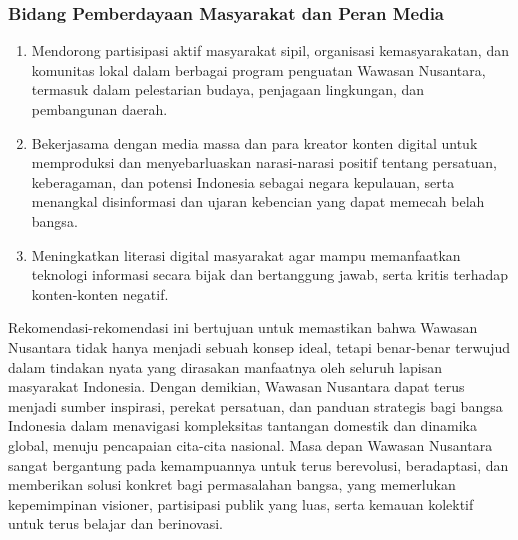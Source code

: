 \documentclass[12pt, a4paper]{article}
\begin{document}
\subsubsection*{Bidang Pemberdayaan Masyarakat dan Peran Media}
\begin{enumerate}
  \item Mendorong partisipasi aktif masyarakat sipil, organisasi kemasyarakatan, dan komunitas lokal dalam berbagai program penguatan Wawasan Nusantara, termasuk dalam pelestarian budaya, penjagaan lingkungan, dan pembangunan daerah.
  \item Bekerjasama dengan media massa dan para kreator konten digital untuk memproduksi dan menyebarluaskan narasi-narasi positif tentang persatuan, keberagaman, dan potensi Indonesia sebagai negara kepulauan, serta menangkal disinformasi dan ujaran kebencian yang dapat memecah belah bangsa.
  \item Meningkatkan literasi digital masyarakat agar mampu memanfaatkan teknologi informasi secara bijak dan bertanggung jawab, serta kritis terhadap konten-konten negatif.
\end{enumerate}
Rekomendasi-rekomendasi ini bertujuan untuk memastikan bahwa Wawasan Nusantara tidak hanya menjadi sebuah konsep ideal, tetapi benar-benar terwujud dalam tindakan nyata yang dirasakan manfaatnya oleh seluruh lapisan masyarakat Indonesia. Dengan demikian, Wawasan Nusantara dapat terus menjadi sumber inspirasi, perekat persatuan, dan panduan strategis bagi bangsa Indonesia dalam menavigasi kompleksitas tantangan domestik dan dinamika global, menuju pencapaian cita-cita nasional. Masa depan Wawasan Nusantara sangat bergantung pada kemampuannya untuk terus berevolusi, beradaptasi, dan memberikan solusi konkret bagi permasalahan bangsa, yang memerlukan kepemimpinan visioner, partisipasi publik yang luas, serta kemauan kolektif untuk terus belajar dan berinovasi.
 
 
\end{document}
